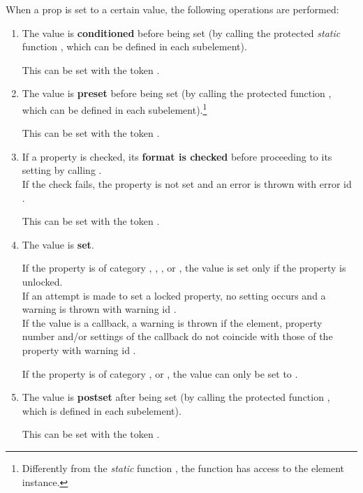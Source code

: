 \documentclass{tufte-handout}
\begin{document}
When a prop is set to a certain value, the following operations are performed:
\begin{enumerate}

\item{} The value is {\bf conditioned} before being set (by calling the protected \emph{static} function , which can be defined in each subelement).
	
	This can be set with the token .
	
\item{} The value is {\bf preset} before being set (by calling the protected function , which can be defined in each subelement).\footnote{Differently from the \emph{static} function , the function  has access to the element instance.}

	This can be set with the token .
	
\item{} If a property is checked, its {\bf format is checked} before proceeding to its setting by calling .\\
	If the check fails, the property is not set and an error is thrown with error id .
	
	This can be set with the token .

\item{} The value is {\bf set}.

	If the property is of category , , , or , the value is set only if the property is unlocked.\\
	If an attempt is made to set a locked property, no setting occurs and a warning is thrown with warning id .\\
	If the value is a callback, a warning is thrown if the element, property number and/or settings of the callback do not coincide with those of the property with warning id .
 
	If the property is of category ,  or , the value can only be set to .

\item{} The value is {\bf postset} after being set (by calling the protected function , which is defined in each subelement).
	
	This can be set with the token .


\end{enumerate}
\end{document}
